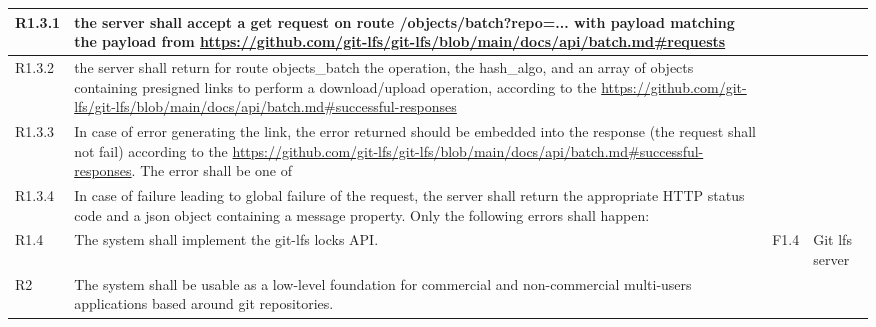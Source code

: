 \documentclass[a4paper,11pt]{article}
\begin{document}
\begin{landscape}
\begin{longtable}{|p{1cm}|p{19cm}|p{2cm}|p{3cm}|}
        \rowcolor[HTML]{EEFFEE}        R1.3.1     & the server shall accept a get request on route /objects/batch?repo=... with payload matching the payload from \url{https://github.com/git-lfs/git-lfs/blob/main/docs/api/batch.md#requests}                                                                                           &                       &                                          \\\hline
        \rowcolor[HTML]{EEFFEE}        R1.3.2     & the server shall return for route objects\_batch the operation, the hash\_algo, and an array of objects containing presigned links to perform a download/upload operation, according to the \url{https://github.com/git-lfs/git-lfs/blob/main/docs/api/batch.md#successful-responses} &                       &                                          \\\hline
        \rowcolor[HTML]{EEFFEE}        R1.3.3     & In case of error generating the link, the error returned should be embedded into the response (the request shall not fail) according to the \url{https://github.com/git-lfs/git-lfs/blob/main/docs/api/batch.md#successful-responses}. The error shall be one of                      &                       &                                          \\\hline
        \rowcolor[HTML]{EEFFEE}        R1.3.4     & In case of failure leading to global failure of the request, the server shall return the appropriate HTTP status code and a json object containing a message property. Only the following errors shall happen:                                                                        &                       &                                          \\\hline
        \rowcolor[HTML]{FFDDDD}        R1.4       & The system shall implement the git-lfs locks API.                                                                                                                                                                                                                                     & F1.4                  & Git lfs server                           \\ \hline
        \rowcolor[HTML]{C0C0C0}        R2         & The system shall be usable as a low-level foundation for commercial and non-commercial multi-users applications based around git repositories.                                                                                                                                        &                       &                                          \\ \hline

\end{longtable}
\end{landscape}
\end{document}
